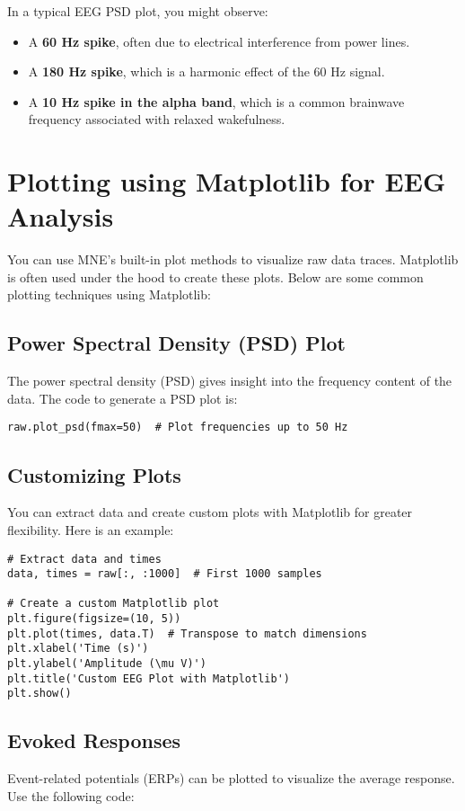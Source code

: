 \documentclass{article}
\begin{document}
In a typical EEG PSD plot, you might observe:
\begin{itemize}
    \item A \textbf{60 Hz spike}, often due to electrical interference from power lines.
    \item A \textbf{180 Hz spike}, which is a harmonic effect of the 60 Hz signal.
    \item A \textbf{10 Hz spike in the alpha band}, which is a common brainwave frequency associated with relaxed wakefulness.
\end{itemize}

\section{Plotting using Matplotlib for EEG Analysis}
You can use MNE's built-in plot methods to visualize raw data traces. Matplotlib is often used under the hood to create these plots. Below are some common plotting techniques using Matplotlib:

\subsection{Power Spectral Density (PSD) Plot}
The power spectral density (PSD) gives insight into the frequency content of the data. The code to generate a PSD plot is:

\begin{verbatim}
raw.plot_psd(fmax=50)  # Plot frequencies up to 50 Hz
\end{verbatim}

\subsection{Customizing Plots}
You can extract data and create custom plots with Matplotlib for greater flexibility. Here is an example:

\begin{verbatim}
# Extract data and times
data, times = raw[:, :1000]  # First 1000 samples

# Create a custom Matplotlib plot
plt.figure(figsize=(10, 5))
plt.plot(times, data.T)  # Transpose to match dimensions
plt.xlabel('Time (s)')
plt.ylabel('Amplitude (\mu V)')
plt.title('Custom EEG Plot with Matplotlib')
plt.show()
\end{verbatim}

\subsection{Evoked Responses}
Event-related potentials (ERPs) can be plotted to visualize the average response. Use the following code:
\end{document}
